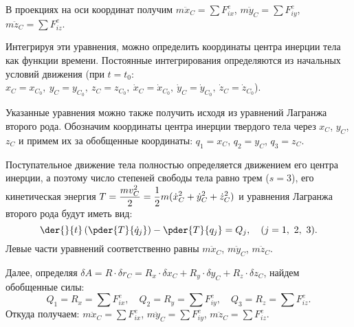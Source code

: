 В проекциях на оси координат получим \( m\ddot{x}_C = \sum F^e_{ix} \),
\( m\ddot{y}_C = \sum F^e_{iy} \), \( m\ddot{z}_C = \sum F^e_{iz} \).

Интегрируя эти уравнения, можно определить координаты центра инерции тела как
функции времени. Постоянные интегрирования определяются из начальных условий
движения (при \( t = t_0 \): \( x_C = x_{C_0},\ y_C = y_{C_0},\ z_C = z_{C_0},\ 
\dot{x}_C = \dot{x}_{C_0},\ \dot{y}_C = \dot{y}_{C_0},\ 
\dot{z}_C = \dot{z}_{C_0} \)).

Указанные уравнения можно также получить исходя из уравнений Лагранжа второго рода.
Обозначим координаты центра инерции твердого тела через \( x_C \), \( y_C \),
\( z_C \) и примем их за обобщенные координаты: \( q_1 = x_C \),
\( q_2 = y_C \), \( q_3 = z_C \).

Поступательное движение тела полностью определяется движением его центра
инерции, а поэтому число степеней свободы тела равно трем (\( s = 3 \)), его
кинетическая энергия \( \displaystyle T = \frac{mv_C^2}{2} = \frac{1}{2}m(\dot{x}_C^2 +
\dot{y}_C^2 + \dot{z}_C^2) \) и уравнения Лагранжа второго рода будут иметь вид:
\[
    \der{}{t}\left( \pder{T}{\dot{q}_j} \right) - \pder{T}{q_j} = Q_j, \quad
    (j = 1,\ 2,\ 3).
\]
Левые части уравнений соответственно равны \( m\ddot{x}_C \), \( m\ddot{y}_C \),
\( m\ddot{z}_C \).

Далее, определяя \( \delta A = R\cdot\delta r_C = R_x\cdot\delta x_C +
R_y\cdot\delta y_C + R_z\cdot\delta z_C \), найдем обобщенные силы:
\[
    Q_1 = R_x = \sum F^e_{ix}, \quad Q_2 = R_y = \sum F^e_{iy}, \quad
    Q_3 = R_z = \sum F^e_{iz}.
\]
Откуда получаем: \( m\ddot{x}_C = \sum F^e_{ix} \),
\( m\ddot{y}_C = \sum F^e_{iy} \), \( m\ddot{z}_C = \sum F^e_{iz} \).
\newpage
